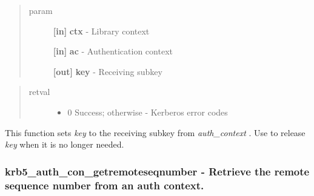 \documentclass[letterpaper,10pt,english]{sphinxmanual}
\begin{document}
\begin{fulllineitems}
\label{appdev/refs/api/krb5_auth_con_getrecvsubkey_k:c.krb5_auth_con_getrecvsubkey_k}
\end{fulllineitems}

\begin{quote}\begin{description}
\item[{param}] \leavevmode
\textbf{{[}in{]}} \textbf{ctx} - Library context

\textbf{{[}in{]}} \textbf{ac} - Authentication context

\textbf{{[}out{]}} \textbf{key} - Receiving subkey

\end{description}\end{quote}
\begin{quote}\begin{description}
\item[{retval}] \leavevmode\begin{itemize}
\item {} 
0   Success; otherwise - Kerberos error codes

\end{itemize}

\end{description}\end{quote}

This function sets \emph{key} to the receiving subkey from \emph{auth\_context} . Use {\hyperref[appdev/refs/api/krb5_k_free_key:c.krb5_k_free_key]{}} to release \emph{key} when it is no longer needed.


\subsubsection{krb5\_auth\_con\_getremoteseqnumber -  Retrieve the remote sequence number from an auth context.}
\label{appdev/refs/api/krb5_auth_con_getremoteseqnumber:krb5-auth-con-getremoteseqnumber-retrieve-the-remote-sequence-number-from-an-auth-context}\label{appdev/refs/api/krb5_auth_con_getremoteseqnumber::doc}
\end{document}
